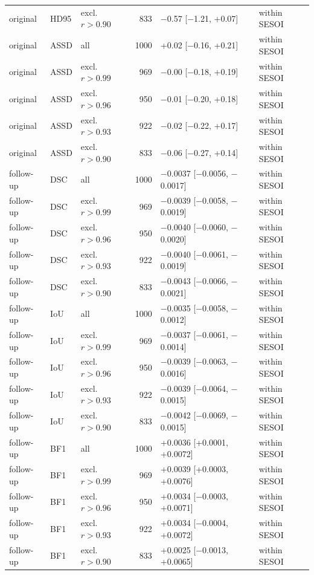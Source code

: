 \begin{tabular}{lllrll}
original & HD95 & excl. $r>0.90$ & 833 & $-$0.57 [$-$1.21, +0.07] & within SESOI \\
original & ASSD & all & 1000 & +0.02 [$-$0.16, +0.21] & within SESOI \\
original & ASSD & excl. $r>0.99$ & 969 & $-$0.00 [$-$0.18, +0.19] & within SESOI \\
original & ASSD & excl. $r>0.96$ & 950 & $-$0.01 [$-$0.20, +0.18] & within SESOI \\
original & ASSD & excl. $r>0.93$ & 922 & $-$0.02 [$-$0.22, +0.17] & within SESOI \\
original & ASSD & excl. $r>0.90$ & 833 & $-$0.06 [$-$0.27, +0.14] & within SESOI \\
follow-up & DSC & all & 1000 & $-$0.0037 [$-$0.0056, $-$0.0017] & within SESOI \\
follow-up & DSC & excl. $r>0.99$ & 969 & $-$0.0039 [$-$0.0058, $-$0.0019] & within SESOI \\
follow-up & DSC & excl. $r>0.96$ & 950 & $-$0.0040 [$-$0.0060, $-$0.0020] & within SESOI \\
follow-up & DSC & excl. $r>0.93$ & 922 & $-$0.0040 [$-$0.0061, $-$0.0019] & within SESOI \\
follow-up & DSC & excl. $r>0.90$ & 833 & $-$0.0043 [$-$0.0066, $-$0.0021] & within SESOI \\
follow-up & IoU & all & 1000 & $-$0.0035 [$-$0.0058, $-$0.0012] & within SESOI \\
follow-up & IoU & excl. $r>0.99$ & 969 & $-$0.0037 [$-$0.0061, $-$0.0014] & within SESOI \\
follow-up & IoU & excl. $r>0.96$ & 950 & $-$0.0039 [$-$0.0063, $-$0.0016] & within SESOI \\
follow-up & IoU & excl. $r>0.93$ & 922 & $-$0.0039 [$-$0.0064, $-$0.0015] & within SESOI \\
follow-up & IoU & excl. $r>0.90$ & 833 & $-$0.0042 [$-$0.0069, $-$0.0015] & within SESOI \\
follow-up & BF1 & all & 1000 & +0.0036 [+0.0001, +0.0072] & within SESOI \\
follow-up & BF1 & excl. $r>0.99$ & 969 & +0.0039 [+0.0003, +0.0076] & within SESOI \\
follow-up & BF1 & excl. $r>0.96$ & 950 & +0.0034 [$-$0.0003, +0.0071] & within SESOI \\
follow-up & BF1 & excl. $r>0.93$ & 922 & +0.0034 [$-$0.0004, +0.0072] & within SESOI \\
follow-up & BF1 & excl. $r>0.90$ & 833 & +0.0025 [$-$0.0013, +0.0065] & within SESOI \\

\end{tabular}
